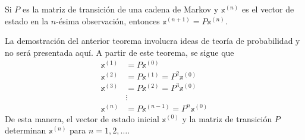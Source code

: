 \begin{theorem}\label{theo:matrix_transition-state}
    Si $P$ es la matriz de transición de una cadena de Markov y $\mathbb{x}^{(n)}$ es el vector de estado en la $n$-ésima observación, entonces $\mathbb{x}^{(n+1)} = P \mathbb{x}^{(n)}$.
\end{theorem}

La demostración del anterior teorema involucra ideas de teoría de probabilidad y no será presentada aquí. A partir de este teorema, se sigue que
\begin{align*}
    \mathbb{x}^{(1)} & = P\mathbb{x}^{(0)} \\
    \mathbb{x}^{(2)} & = P\mathbb{x}^{(1)} = P^2\mathbb{x}^{(0)} \\
    \mathbb{x}^{(3)} & = P\mathbb{x}^{(2)} = P^3\mathbb{x}^{(0)} \\
    & \vdots \\
    \mathbb{x}^{(n)} & = P\mathbb{x}^{(n-1)} = P^n\mathbb{x}^{(0)}
\end{align*}
De esta manera, el vector de estado inicial $\mathbb{x}^{(0)}$ y la matriz de transición $P$ determinan $\mathbb{x}^{(n)}$ para $n = 1, 2, \dots$.


